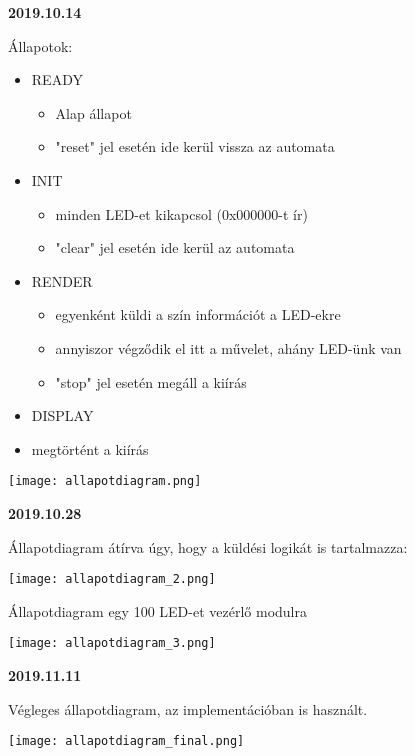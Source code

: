
\textbf{2019.10.14}

Állapotok:
\begin{itemize}
\item READY
	\begin{itemize}
	\item Alap állapot 
	\item "reset" jel esetén ide kerül vissza az automata
	\end{itemize}
\item INIT
	\begin{itemize}
	\item minden LED-et kikapcsol (0x000000-t ír)
	\item "clear" jel esetén ide kerül az automata
	\end{itemize}
\item RENDER
	\begin{itemize}
	\item egyenként küldi a szín információt a LED-ekre
	\item annyiszor végződik el itt a művelet, ahány LED-ünk van
	\item "stop" jel esetén megáll a kiírás
	\end{itemize}
\item DISPLAY
	\item megtörtént a kiírás
\end{itemize}

\texttt{[image: allapotdiagram.png]}

\textbf{2019.10.28}

Állapotdiagram átírva úgy, hogy a küldési logikát is tartalmazza:

\texttt{[image: allapotdiagram\_2.png]}

Állapotdiagram egy 100 LED-et vezérlő modulra

\texttt{[image: allapotdiagram\_3.png]}

\textbf{2019.11.11}

Végleges állapotdiagram, az implementációban is használt.

\texttt{[image: allapotdiagram\_final.png]}

